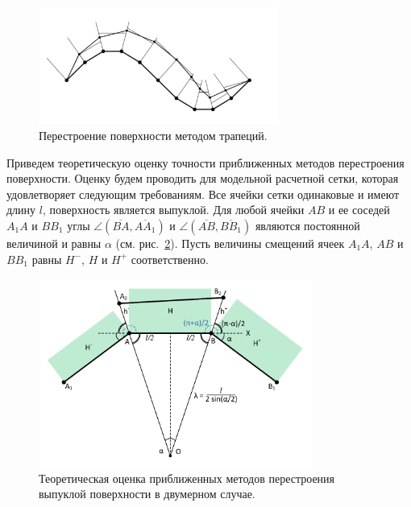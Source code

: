\begin{figure}[ht]
\centering
\includegraphics[width=0.7\textwidth]{pics/text_1_remesh_2d/grid_trapeziums.pdf}
\singlespacing
{}\caption{Перестроение поверхности методом трапеций.}
\label{fig:text_1_remesh_2d_grid_trapeziums}
\end{figure}

Приведем теоретическую оценку точности приближенных методов перестроения поверхности.
Оценку будем проводить для модельной расчетной сетки, которая удовлетворяет следующим требованиям.
Все ячейки сетки одинаковые и имеют длину $l$, поверхность является выпуклой.
Для любой ячейки $AB$ и ее соседей $A_1A$ и $BB_1$ углы $\angle (\overline{BA}, \overline{AA_1})$ и $\angle (\overline{AB}, \overline{BB_1})$ являются постоянной величиной и равны $\alpha$ (см. рис.~\ref{fig:text_1_remesh_2d_theoretical}).
Пусть величины смещений ячеек $A_1A$, $AB$ и $BB_1$ равны $H^{-}$, $H$ и $H^{+}$ соответственно.

\begin{figure}[ht]
\centering
\includegraphics[width=0.8\textwidth]{pics/text_1_remesh_2d/theoretical.pdf}
\singlespacing
{}\caption{Теоретическая оценка приближенных методов перестроения выпуклой поверхности в двумерном случае.}
\label{fig:text_1_remesh_2d_theoretical}
\end{figure}

